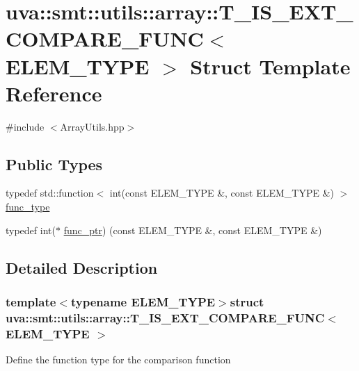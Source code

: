 \hypertarget{structuva_1_1smt_1_1utils_1_1array_1_1_t___i_s___e_x_t___c_o_m_p_a_r_e___f_u_n_c}{}\section{uva\+:\+:smt\+:\+:utils\+:\+:array\+:\+:T\+\_\+\+I\+S\+\_\+\+E\+X\+T\+\_\+\+C\+O\+M\+P\+A\+R\+E\+\_\+\+F\+U\+N\+C$<$ E\+L\+E\+M\+\_\+\+T\+Y\+P\+E $>$ Struct Template Reference}
\label{structuva_1_1smt_1_1utils_1_1array_1_1_t___i_s___e_x_t___c_o_m_p_a_r_e___f_u_n_c}


{\ttfamily \#include $<$Array\+Utils.\+hpp$>$}

\subsection*{Public Types}
\begin{DoxyCompactItemize}
\item 
typedef std\+::function$<$ int(const E\+L\+E\+M\+\_\+\+T\+Y\+P\+E \&, const E\+L\+E\+M\+\_\+\+T\+Y\+P\+E \&) $>$ \hyperlink{structuva_1_1smt_1_1utils_1_1array_1_1_t___i_s___e_x_t___c_o_m_p_a_r_e___f_u_n_c_ae36341efb501d528ceaaf0978b41cae3}{func\+\_\+type}
\item 
typedef int($\ast$ \hyperlink{structuva_1_1smt_1_1utils_1_1array_1_1_t___i_s___e_x_t___c_o_m_p_a_r_e___f_u_n_c_aa0d104e289af2a3bf008c5051821212e}{func\+\_\+ptr}) (const E\+L\+E\+M\+\_\+\+T\+Y\+P\+E \&, const E\+L\+E\+M\+\_\+\+T\+Y\+P\+E \&)
\end{DoxyCompactItemize}


\subsection{Detailed Description}
\subsubsection*{template$<$typename E\+L\+E\+M\+\_\+\+T\+Y\+P\+E$>$struct uva\+::smt\+::utils\+::array\+::\+T\+\_\+\+I\+S\+\_\+\+E\+X\+T\+\_\+\+C\+O\+M\+P\+A\+R\+E\+\_\+\+F\+U\+N\+C$<$ E\+L\+E\+M\+\_\+\+T\+Y\+P\+E $>$}

Define the function type for the comparison function 

